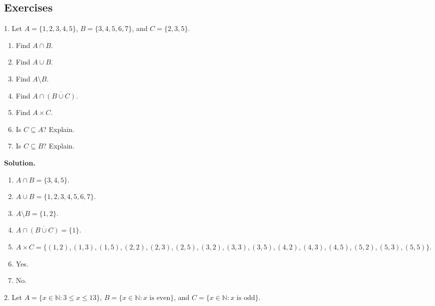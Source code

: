 \documentclass[10pt,]{book}
\theoremstyle{plain}
\theoremstyle{definition}
\theoremstyle{definition}
\theoremstyle{definition}
\def\N{\mathbb N}
\def\st{:}
\renewcommand{\bar}{\overline}
\begin{document}
\subsection[Exercises]{Exercises}\label{exercises-2}
\begin{exerciselist}
\item[1.]\hypertarget{exercise-11}{}
          Let \(A = \{1,2,3,4,5\}\), \(B = \{3,4,5,6,7\}\), and \(C = \{2,3,5\}\).
\leavevmode%
\begin{enumerate}[label=(\alph*)]
\item\hypertarget{li-228}{} Find \(A \cap B\). %
\item\hypertarget{li-229}{} Find \(A \cup B\). %
\item\hypertarget{li-230}{} Find \(A \setminus B\). %
\item\hypertarget{li-231}{} Find \(A \cap \overline{(B \cup C)}\). %
\item\hypertarget{li-232}{} Find \(A \times C\). %
\item\hypertarget{li-233}{} Is \(C \subseteq A\)? Explain. %
\item\hypertarget{li-234}{} Is \(C \subseteq B\)? Explain. %
\end{enumerate}
\par\smallskip
\par\smallskip
\noindent\textbf{Solution.}\hypertarget{solution-23}{}\quad
\leavevmode%
\begin{enumerate}[label=(\alph*)]
\item\hypertarget{li-235}{}\(A \cap B = \{3,4,5\}\).\item\hypertarget{li-236}{}\(A \cup B = \{1,2,3,4,5,6,7\}\).\item\hypertarget{li-237}{}\(A \setminus B = \{1,2\}\).\item\hypertarget{li-238}{}\(A \cap \bar{(B \cup C)} = \{1\}\).\item\hypertarget{li-239}{}\(A \times C = \{(1,2), (1,3), (1,5), (2,2), (2,3), (2,5), (3,2), (3,3), (3,5), (4,2), (4,3), (4,5), (5,2), (5,3), (5,5)\}\).\item\hypertarget{li-240}{}Yes.%
\item\hypertarget{li-241}{}No.%
\end{enumerate}
\item[2.]\hypertarget{exercise-12}{}
          Let \(A = \{x \in \N \st 3 \le x \le 13\}\), \(B = \{x \in \N \st x \mbox{ is even} \}\), and \(C = \{x \in \N \st x \mbox{ is odd} \}\).
\leavevmode%
\begin{enumerate}[label=(\alph*)]

\end{enumerate}
\end{exerciselist}
\end{document}
